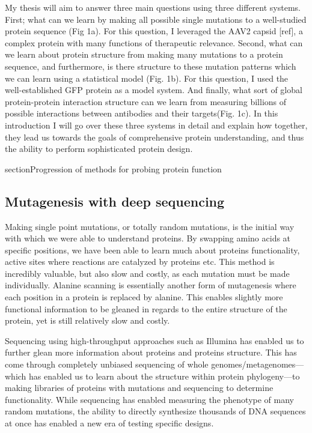 My thesis will aim to answer three main questions using three different systems. First; what can we learn by making all possible single mutations to a well-studied protein sequence (Fig 1a). For this question, I leveraged the AAV2 capsid [ref], a complex protein with many functions of therapeutic relevance. Second, what can we learn about protein structure from making many mutations to a protein sequence, and furthermore, is there structure to these mutation patterns which we can learn using a statistical model (Fig. 1b). For this question, I used the well-established GFP protein as a model system. And finally, what sort of global protein-protein interaction structure can we learn from measuring billions of possible interactions between antibodies and their targets(Fig. 1c). In this introduction I will go over these three systems in detail and explain how together, they lead us towards the goals of comprehensive protein understanding, and thus the ability to perform sophisticated protein design. 

section{Progression of methods for probing protein function}

\subsection{Mutagenesis with deep sequencing}

Making single point mutations, or totally random mutations, is the initial way with which we were able to understand proteins. By swapping amino acids at specific positions, we have been able to learn much about proteins functionality, active sites where reactions are catalyzed by proteins etc. This method is incredibly valuable, but also slow and costly, as each mutation must be made individually. Alanine scanning is essentially another form of mutagenesis where each position in a protein is replaced by alanine\cite{Morrison2001-qe}. This enables slightly more functional information to be gleaned in regards to the entire structure of the protein, yet is still relatively slow and costly.

Sequencing using high-throughput approaches such as Illumina has enabled us to further glean more information about proteins and proteins structure. This has come through completely unbiased sequencing of whole genomes/metagenomes\cite{Rodrigue2010-sl,Poinar2006-gc}---which has enabled us to learn about the structure within protein phylogeny---to making libraries of proteins with mutations and sequencing to determine functionality\cite{Fowler2014-ar,Taylor2016-wr,Wu2014-cr}. While sequencing has enabled measuring the phenotype of many random mutations, the ability to directly synthesize thousands of DNA sequences at once has enabled a new era of testing specific designs\cite{Weingarten-Gabbay2016-ws,Starita2015-uk}.

